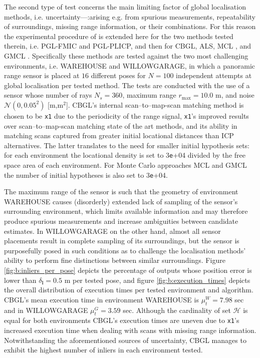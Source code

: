 The second type of test concerns the main limiting factor of global
localisation methods, i.e. uncertainty---:arising e.g. from spurious
measurements, repeatability of surroundings, missing range information, or
their combinations. For this reason the experimental procedure of
\cite{Filotheou2022g} is extended here for the two methods tested therein,
i.e. PGL-FMIC and PGL-PLICP, and then for CBGL, ALS, MCL \cite{mcl}, and GMCL
\cite{gmcl}.  Specifically these methods are tested against the two most
challenging environments, i.e. WAREHOUSE and WILLOWGARAGE, in which a panoramic
range sensor is placed at $16$ different poses for $N = 100$ independent
attempts at global localisation per tested method. The tests are conducted with
the use of a sensor whose number of rays $N_s = 360$, maximum range
$r_{\max} = 10.0$ m, and noise $\mathcal{N}(0, 0.05^2)$ [m,m$^2$]. CBGL's
internal scan--to--map-scan matching method is chosen to be \texttt{x1}
\cite{Filotheou2023a} due to the periodicity of the range signal,
\texttt{x1}'s improved results over scan--to--map-scan matching state of the
art methods, and its ability in matching scans captured from greater initial
locational distances than ICP alternatives. The latter translates to the need
for smaller initial hypothesis sets: for each environment the locational
density is set to $3$\texttt{e}+04 divided by the free space area
of each environment. For Monte Carlo approaches MCL and GMCL the number of
initial hypotheses is also set to $3$\texttt{e}+04.

The maximum range of the sensor is such that the geometry of environment
WAREHOUSE causes (disorderly) extended lack of sampling of the sensor's
surrounding environment, which limits available information and may therefore
produce spurious measurements and increase ambiguities between candidate
estimates. In WILLOWGARAGE on the other hand, almost all sensor placements
result in complete sampling of its surroundings, but the sensor is purposefully
posed in such conditions as to challenge the localisation methods' ability to
perform fine distinctions between similar surroundings. Figure
\ref{fig:b:inliers_per_pose} depicts the percentage of outputs whose position
error is lower than $\delta_{\bm{l}} = 0.5$ m per tested pose, and figure
\ref{fig:b:execution_times} depicts the overall distribution of execution times
per tested environment and algorithm. CBGL's mean execution time in environment
WAREHOUSE is $\mu_t^W = 7.98$ sec and in WILLOWGARAGE $\mu_t^{G} = 3.59$ sec.
Although the cardinality of set $\mathcal{H}$ is equal for both environments
CBGL's execution times are uneven due to \texttt{x1}'s increased execution
time when dealing with scans with missing range information. Notwithstanding
the aforementioned sources of uncertainty, CBGL manages to exhibit the highest
number of inliers in each environment tested.


